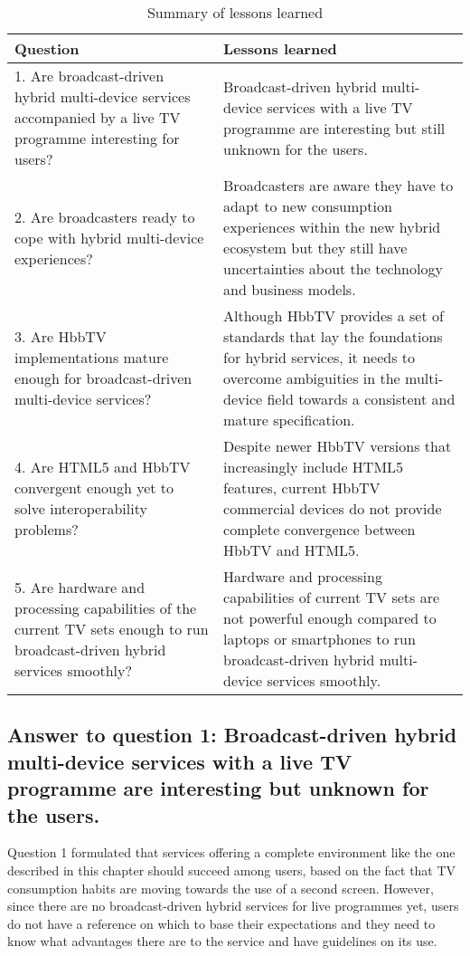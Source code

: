 \begin{table}
	\begin{center}
		\caption{Summary of lessons learned}\label{tab:learnedlessons}
		\begin{tabular}{||m{5.5cm}|m{7.5cm}||}
			\hline
			\textbf{Question} & \textbf{Lessons learned} \\
			\hline
			1. Are broadcast-driven hybrid multi-device services accompanied by a live TV programme interesting for users? &
			Broadcast-driven hybrid multi-device services with a live TV programme are interesting but still unknown for the users. \\
			\hline
			2. Are broadcasters ready to cope with hybrid multi-device experiences? &
			Broadcasters are aware they have to adapt to new consumption experiences within the new hybrid ecosystem but they still have uncertainties about the technology and business models.  \\
			\hline			
			3. Are HbbTV implementations mature enough for broadcast-driven multi-device services? &
			Although HbbTV provides a set of standards that lay the foundations for hybrid services, it needs to overcome ambiguities in the multi-device field towards a consistent and mature specification.			
			\\
			\hline
			4. Are HTML5 and HbbTV convergent enough yet to solve interoperability problems? 
			&  Despite newer HbbTV versions that increasingly include HTML5 features, current HbbTV commercial devices do not provide complete convergence between HbbTV and HTML5. \\
			\hline
			5. Are hardware and processing capabilities of the current TV sets enough to run broadcast-driven hybrid services smoothly? &
			Hardware and processing capabilities of current TV sets are not powerful enough compared to laptops or smartphones to run broadcast-driven hybrid multi-device services smoothly.
			\\
			\hline
			
		\end{tabular}
	\end{center}
\end{table}

\subsection{Answer to question 1: Broadcast-driven hybrid multi-device services with a live TV programme are interesting but unknown for the users.}
Question 1 formulated that services offering a complete environment like the one described in this chapter should succeed among users, based on the fact that TV consumption habits are moving towards the use of a second screen. However, since there are no broadcast-driven hybrid services for live programmes yet, users do not have a reference on which to base their expectations and they need to know what advantages there are to the service and have guidelines on its use.


